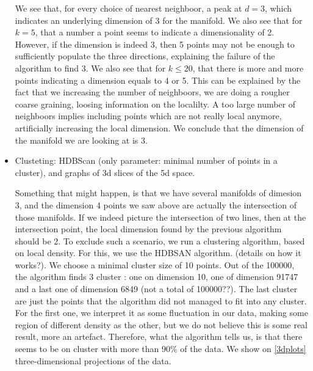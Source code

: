 \documentclass[11pt]{article}
\begin{document}
\begin{itemize}[label=\textbullet]
		We see that, for every choice of nearest neighboor, a peak at $d=3$, which indicates an underlying dimension of 3 for the manifold. We also see that for $k=5$, that a number a point seems to indicate a dimensionality of 2. However, if the dimension is indeed 3, then 5 points may not be enough to sufficiently populate the three directions, explaining the failure of the algorithm to find 3. We also see that for $k\le20$, that there is more and more points indicating a dimension equals to 4 or 5. This can be explained by the fact that we increasing the number of neighboors, we are doing a rougher coarse graining, loosing information on the localilty. A too large number of neighboors implies including points which are not really local anymore, artificially increasing the local dimension. We conclude that the dimension of the manifold we are looking at is 3. 
		
		\item Clusteting: HDBScan (only parameter: minimal number of points in a cluster), and graphs of 3d slices of the 5d space.
		
		Something that might happen, is that we have several manifolds of dimesion 3, and the dimension 4 points we saw above are actually the intersection of those manifolds. If we indeed picture the intersection of two lines, then at the intersection point, the local dimension found by the previous algorithm should be 2. To exclude such a scenario, we run a clustering algorithm, based on local density. For this, we use the HDBSAN algorithm. (details on how it works?). We choose a minimal cluster size of 10 points. Out of the 100000, the algorithm finds 3 cluster : one on dimension 10, one of dimension 91747 and a last one of dimension 6849 (not a total of 100000??). The last cluster are just the points that the algorithm did not managed to fit into any cluster. For the first one, we interpret it as some fluctuation in our data, making some region of different density as the other, but we do not believe this is some real result, more an artefact. Therefore, what the algorithm tells us, is that there seems to be on cluster with more than $90\%$ of the data. We show on \ref{3dplots} three-dimensional projections of the data. 
		

\end{itemize}
\end{document}
